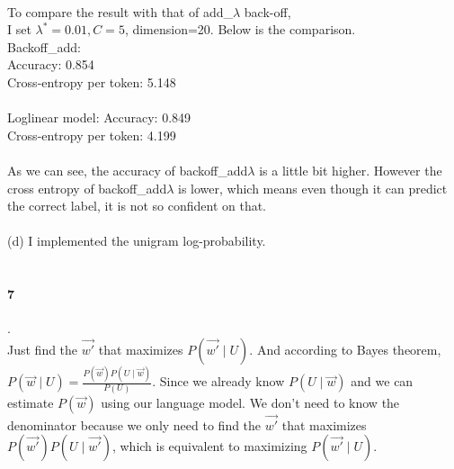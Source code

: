 \documentclass[11pt]{article}
\begin{document}
\\
To compare the result with that of add\_$\lambda$ back-off,\\
I set $\lambda^*=0.01, C=5$, dimension=20. Below is the comparison.\\
Backoff\_add:\\
Accuracy: 0.854\\
Cross-entropy per token: 5.148\\
\\
Loglinear model:
Accuracy: 0.849\\
Cross-entropy per token: 4.199\\
\\
As we can see, the accuracy of backoff\_add$\lambda$ is a little bit higher. However the cross entropy of backoff\_add$\lambda$ is lower, which means even though it can predict the correct label, it is not so confident on that.\\
\\
(d)
I implemented the unigram log-probability.\\
\\
\paragraph{7}.\\
Just find the $\vec{w'}$ that maximizes $P(\vec{w'}\mid U)$. And according to Bayes theorem, $P(\vec{w}\mid U)=\frac{P(\vec{w})P(U\mid \vec{w})}{P(U)}$. Since we already know $P(U\mid \vec{w})$ and we can estimate $P(\vec{w})$ using our language model. We don't need to know the denominator because we only need to find the $\vec{w'}$ that maximizes $P(\vec{w'})P(U\mid \vec{w'})$, which is equivalent to maximizing $P(\vec{w'}\mid U)$.\\
\end{document}
